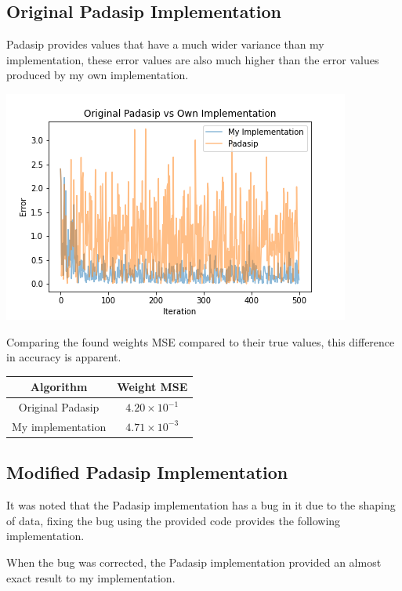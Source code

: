 \documentclass[sigconf]{acmart}
\begin{document}
\subsection{Original Padasip Implementation}
Padasip provides values that have a much wider variance than my implementation, these error  values are also much higher than the error values produced by my own implementation.

\begin{center}
    \includegraphics[width=\linewidth]{figs/OrigPadasip.png}
\end{center}

Comparing the found weights MSE compared to their true values, this difference in accuracy is apparent.
\begin{center}
    \begin{tabular}{| c c |}
        \hline
        Algorithm & Weight MSE \\ 
        \hline\hline
        Original Padasip & $4.20 \times 10^{-1}$\\ 
        My implementation & $4.71 \times 10^{-3}$\\
        \hline      
    \end{tabular}
\end{center}

\subsection{Modified Padasip Implementation}
It was noted that the Padasip implementation has a bug in it due to the shaping of data, fixing the bug using the provided code provides the following implementation.

When the bug was corrected, the Padasip implementation provided an almost exact result to my implementation.
\end{document}
